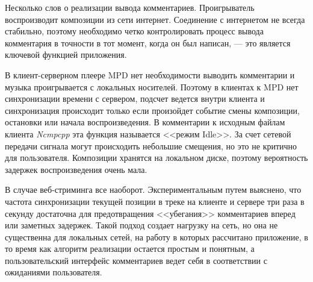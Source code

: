 
Несколько слов о реализации вывода комментариев. Проигрыватель
воспроизводит композиции из сети интернет. Соединение с интернетом не
всегда стабильно, поэтому необходимо четко контролировать процесс
вывода комментария в точности в тот момент, когда он был написан, ---
это является ключевой функцией приложения.

В клиент-серверном плеере MPD нет необходимости выводить комментарии и музыка проигрывается с
локальных носителей. Поэтому в клиентах к MPD нет синхронизации
времени с сервером, подсчет ведется внутри клиента и синхронизация
происходит только если произойдет событие смены композиции, остановки
или начала воспроизведения. В комментарии к исходным файлам клиента
\textit{Ncmpcpp} эта функция называется <<режим Idle>>. За счет сетевой
передачи сигнала могут происходить небольшие смещения, но это не
критично для пользователя. Композиции хранятся на локальном диске,
поэтому вероятность задержек воспроизведения очень мала.

В случае веб-стриминга все наоборот. Экспериментальным путем
выяснено, что частота синхронизации текущей позиции в треке на клиенте
и сервере три раза в секунду достаточна для предотвращения
<<убегания>> комментариев вперед или заметных задержек. Такой подход
создает нагрузку на сеть, но она не существенна для локальных сетей,
на работу в которых рассчитано приложение, в то время как алгоритм
реализации остается простым и понятным, а пользовательский
интерфейс комментариев ведет себя в соответствии с ожиданиями
пользователя.
